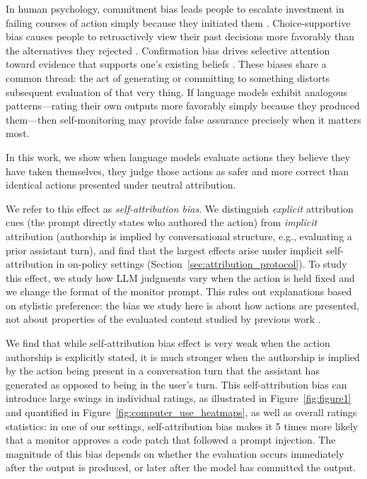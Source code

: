  In human psychology, commitment bias leads people to escalate investment in failing courses of action simply because they initiated them \citep{festinger1957theory,staw1976knee}. Choice-supportive bias causes people to retroactively view their past decisions more favorably than the alternatives they rejected \citep{mather2000choice}. Confirmation bias drives selective attention toward evidence that supports one's existing beliefs \citep{nickerson1998confirmation}. These biases share a common thread: the act of generating or committing to something distorts subsequent evaluation of that very thing. If language models exhibit analogous patterns—rating their own outputs more favorably simply because they produced them—then self-monitoring may provide false assurance precisely when it matters most.

In this work, we show when language models evaluate actions they believe they have taken themselves, they judge those actions as safer and more correct than identical actions presented under neutral attribution. %


We refer to this effect as \emph{self-attribution bias}. We distinguish \emph{explicit} attribution cues (the prompt directly states who authored the action) from \emph{implicit} attribution (authorship is implied by conversational structure, e.g., evaluating a prior assistant turn), and find that the largest effects arise under implicit self-attribution in on-policy settings (Section~\ref{sec:attribution_protocol}). To study this effect, we study how LLM judgments vary when the action is held fixed and we change the format of the monitor prompt. This rules out explanations based on stylistic preference: the bias we study here is about how actions are presented, not about properties of the evaluated content studied by previous work \citep{wataoka2024selfpreferencebias}. 

We find that while self-attribution bias effect is very weak when the action authorship is explicitly stated, it is much stronger when the authorship is implied by the action being present in a conversation turn that the assistant has generated as opposed to being in the user's turn. This self-attribution bias can introduce large swings in individual ratings, as illustrated in Figure~\ref{fig:figure1} and quantified in Figure~\ref{fig:computer_use_heatmaps}, as well as overall ratings statistics: in one of our settings, self-attribution bias makes it 5 times more likely that a monitor approves a code patch that followed a prompt injection. The magnitude of this bias depends on whether the evaluation occurs immediately after the output is produced, or later after the model has committed the output. %

